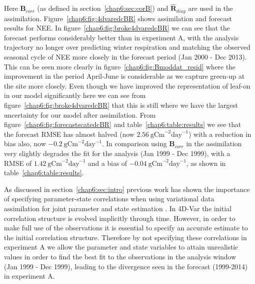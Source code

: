 Here $\textbf{B}_{corr}$ (as defined in section~\ref{chap6:sec:corB}) and $\hat{\textbf{R}}_{diag}$ are used in the assimilation. Figure~\ref{chap6:fig:4dvaredcBR} shows assimilation and forecast results for NEE. In figure~\ref{chap6:fig:broke4dvaredcBR} we can see that the forecast performs considerably better than in experiment A, with the analysis trajectory no longer over predicting winter respiration and matching the observed seasonal cycle of NEE more closely in the forecast period (Jan 2000 - Dec 2013). This can be seen more clearly in figure~\ref{chap6:fig:Bmoddat_resid} where the improvement in the period April-June is considerable as we capture green-up at the site more closely. Even though we have improved the representation of leaf-on in our model significantly here we can see from figure~\ref{chap6:fig:broke4dvaredcBR} that this is still where we have the largest uncertainty for our model after assimilation. From figure~\ref{chap6:fig:forecastscatedcBR} and table~\ref{chap6:table:results} we see that the forecast RMSE has almost halved (now $2.56 ~\text{gCm}^{-2}\text{day}^{-1}$) with a reduction in bias also, now $-0.2 ~\text{gCm}^{-2}\text{day}^{-1}$. In comparison using $\textbf{B}_{corr}$ in the assimilation very slightly degrades the fit for the analysis (Jan 1999 - Dec 1999), with a RMSE of $1.42 ~\text{gCm}^{-2}\text{day}^{-1}$ and a bias of $-0.04 ~\text{gCm}^{-2}\text{day}^{-1}$, as shown in table~\ref{chap6:table:results}. 

As discussed in section~\ref{chap6:sec:intro} previous work has shown the importance of specifying parameter-state correlations when using variational data assimilation for joint parameter and state estimation \citep{smith2009variational}. In 4D-Var the initial correlation structure is evolved implicitly through time. However, in order to make full use of the observations it is essential to specify an accurate estimate to the initial correlation structure. Therefore by not specifying these correlations in experiment A we allow the parameter and state variables to attain unrealistic values in order to find the best fit to the observations in the analysis window (Jan 1999 - Dec 1999), leading to the divergence seen in the forecast (1999-2014) in experiment A.
 
